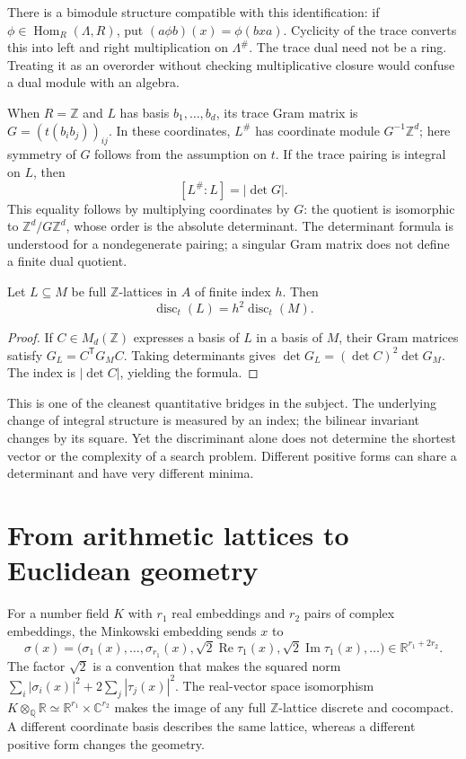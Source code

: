There is a bimodule structure compatible with this identification:
if $\phi\in\operatorname{Hom}_R(\Lambda,R)$, put
$(a\phi b)(x)=\phi(bxa)$. Cyclicity of the trace converts this
into left and right multiplication on $\Lambda^{\#}$.
The trace dual need not be a ring. Treating it as an overorder
without checking multiplicative closure would confuse a dual
module with an algebra.

When $R=\mathbb Z$ and $L$ has basis $b_1,\ldots,b_d$, its trace
Gram matrix is $G=(t(b_ib_j))_{ij}$. In these coordinates,
$L^{\#}$ has coordinate module $G^{-1}\mathbb Z^d$; here
symmetry of $G$ follows from the assumption on $t$. If the trace
pairing is integral on $L$, then
\[
 [L^{\#}:L]=|\det G|.
\]
This equality follows by multiplying coordinates by $G$: the
quotient is isomorphic to $\mathbb Z^d/G\mathbb Z^d$, whose
order is the absolute determinant. The determinant formula is
understood for a nondegenerate pairing; a singular Gram matrix
does not define a finite dual quotient.

\begin{proposition}
Let $L\subseteq M$ be full $\mathbb Z$-lattices in $A$ of finite
index $h$. Then
\[
 \operatorname{disc}_t(L)=h^2\operatorname{disc}_t(M).
\]
\end{proposition}

\begin{proof}
If $C\in M_d(\mathbb Z)$ expresses a basis of $L$ in a basis
of $M$, their Gram matrices satisfy $G_L=C^{\mathsf T}G_MC$.
Taking determinants gives
$\det G_L=(\det C)^2\det G_M$. The index is
$|\det C|$, yielding the formula.
\end{proof}

This is one of the cleanest quantitative bridges in the subject.
The underlying change of integral structure is measured by an
index; the bilinear invariant changes by its square. Yet the
discriminant alone does not determine the shortest vector or the
complexity of a search problem. Different positive forms can share
a determinant and have very different minima.

\section{From arithmetic lattices to Euclidean geometry}

For a number field $K$ with $r_1$ real embeddings and $r_2$ pairs
of complex embeddings, the Minkowski embedding sends $x$ to
\[
 \sigma(x)=\bigl(\sigma_1(x),\ldots,\sigma_{r_1}(x),
 \sqrt2\operatorname{Re}\tau_1(x),
 \sqrt2\operatorname{Im}\tau_1(x),\ldots\bigr)
 \in\mathbb R^{r_1+2r_2}.
\]
The factor $\sqrt2$ is a convention that makes the squared norm
$\sum_i|\sigma_i(x)|^2+2\sum_j|\tau_j(x)|^2$. The real-vector
space isomorphism
$K\otimes_{\mathbb Q}\mathbb R\simeq
\mathbb R^{r_1}\times\mathbb C^{r_2}$ makes the image of any full
$\mathbb Z$-lattice discrete and cocompact. A different coordinate
basis describes the same lattice, whereas a different positive form
changes the geometry.

